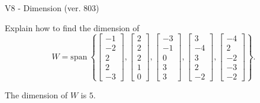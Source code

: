 \begin{exercise}
  \begin{exerciseTitle}V8 - Dimension (ver. 803)\end{exerciseTitle}
  \begin{exerciseStatement}
    Explain how to find the dimension of 
\[W=\mathrm{span}\ \left\{\left[\begin{array}{r}
-1 \\
-2 \\
2 \\
2 \\
-3
\end{array}\right] , \left[\begin{array}{r}
2 \\
2 \\
2 \\
1 \\
0
\end{array}\right] , \left[\begin{array}{r}
-3 \\
-1 \\
0 \\
3 \\
3
\end{array}\right] , \left[\begin{array}{r}
3 \\
-4 \\
3 \\
2 \\
-2
\end{array}\right] , \left[\begin{array}{r}
-4 \\
2 \\
-2 \\
-3 \\
-2
\end{array}\right]\right\}.\]



  \end{exerciseStatement}
  \begin{exerciseAnswer}
   The dimension of \(W\) is  \(5\).
  


  \end{exerciseAnswer}
\end{exercise}